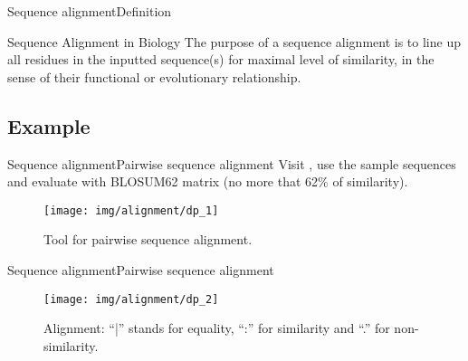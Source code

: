 \documentclass[10pt]{beamer}
\newcommand{\1}{
	\setbeamertemplate{background}{
		\texttt{[image: img/1]}
		\tikz[overlay] \fill[fill opacity=0.75,fill=white] (0,0) rectangle (-\paperwidth,\paperheight);
	}
}
\begin{document}
\begin{frame}{Sequence alignment}{Definition}
	
	\begin{block}{Sequence Alignment in Biology}
		\centering
		The purpose of a sequence alignment is to line
		up all residues in the inputted sequence(s) for
		maximal level of similarity, in the sense of their
		functional or evolutionary relationship.
	\end{block}
	
\end{frame}


\subsection{Example}


\begin{frame}{Sequence alignment}{Pairwise sequence alignment}	
	Visit \href{https://www.ebi.ac.uk/Tools/psa/emboss_needle/}{}, use the sample  sequences and evaluate with BLOSUM62 matrix (no more that 62\% of similarity).
	
	\begin{figure}[]
		\centering
		\texttt{[image: img/alignment/dp\_1]}
		\label{img:uniprot}
		\caption{Tool for pairwise sequence alignment.}
	\end{figure}
\end{frame}

\begin{frame}{Sequence alignment}{Pairwise sequence alignment}		
	\begin{figure}[]
		\centering
		\texttt{[image: img/alignment/dp\_2]}
		\label{img:uniprot}
		\caption{Alignment: ``|'' stands for equality, ``:'' for similarity and ``.'' for non-similarity.}
	\end{figure}
\end{frame}
\end{document}
